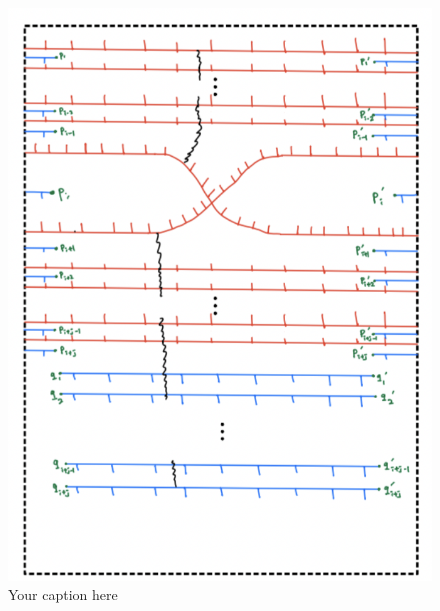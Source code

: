 \begin{figure}[H] %
    \centering
    \includegraphics[width=\linewidth]{diagrams/theorem12/16.png} %
    \caption{Your caption here}
    \label{fig:your-label}
\end{figure}